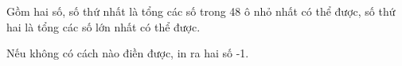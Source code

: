 Gồm hai số, số thứ nhất là tổng các số trong 48 ô nhỏ nhất có thể được, số thứ hai là tổng các số lớn nhất có thể được.  

   Nếu không có cách nào điền được, in ra hai số -1.